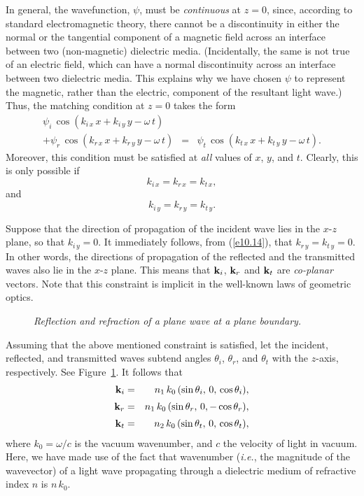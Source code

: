 In general, the wavefunction, $\psi$, must be {\em continuous}\/ at $z=0$, since, according to standard electromagnetic theory,  there cannot be a discontinuity in either the
normal or the tangential component of a magnetic field across an interface between two (non-magnetic) dielectric media. (Incidentally,
the same is not true of an electric field, which can have a normal discontinuity across
an interface between two dielectric media. This explains why we have chosen  $\psi$ to represent the magnetic, rather than the electric,
component of the resultant light wave.) Thus, the matching condition at $z=0$ takes the form
\begin{eqnarray}
\psi_i\,\cos(k_{i\,x}\,x+k_{i\,y}\,y-\omega\,t)&&\nonumber\\[0.5ex] + \psi_r\,\cos(k_{r\,x}\,x+k_{r\,y}\,y-\omega\,t)&=&\psi_t\,\cos(k_{t\,x}\,x+k_{t\,y}\,y-\omega\,t).
\end{eqnarray}
Moreover, this condition must be satisfied at {\em all}\/ values of $x$, $y$, and $t$. Clearly, this is only possible if
\begin{equation}\label{e10.13}
k_{i\,x} = k_{r\,x} = k_{t\,x},
\end{equation}
and
\begin{equation}\label{e10.14}
k_{i\,y} = k_{r\,y} = k_{t\,y}.
\end{equation}

Suppose that the direction of propagation of the incident wave lies in the $x$-$z$ plane, so that $k_{i\,y}=0$. It immediately
follows, from (\ref{e10.14}), that $k_{r\,y}=k_{t\,y}=0$. In other words, the directions of propagation of the reflected
and the transmitted waves also lie in the $x$-$z$ plane.  This means that ${\bf k}_i$, ${\bf k}_r$ and ${\bf k}_t$ are 
{\em co-planar}\/ vectors. Note that  this constraint is implicit in the well-known laws of
geometric optics. 

\begin{figure}
\epsfysize=3in
\centerline{}
\caption{\em Reflection and refraction of a plane wave at a plane boundary.}\label{f10.3}   
\end{figure}

Assuming that the above mentioned constraint is satisfied, let the incident, reflected, and transmitted waves subtend 
angles $\theta_i$, $\theta_r$, and $\theta_t$ with the $z$-axis, respectively. See Figure~\ref{f10.3}. It follows that
\begin{eqnarray}
{\bf k}_i &=& n_1\,k_0\,(\sin\theta_i,\,0,\,\cos\theta_i),\\[0.5ex]
{\bf k}_r &=&n_1\, k_0\,(\sin\theta_r,\,0,-\cos\theta_r),\\[0.5ex]
{\bf k}_t &=&n_2\,k_0\,(\sin\theta_t,\,0,\,\cos\theta_t),
\end{eqnarray}
where $k_0=\omega/c$ is the vacuum wavenumber, and $c$ the velocity of light in vacuum.
Here, we have made use of the fact that wavenumber ({\em i.e.}, the magnitude of the wavevector) of a light wave propagating through a dielectric medium of
refractive index $n$ is $n\,k_0$.

